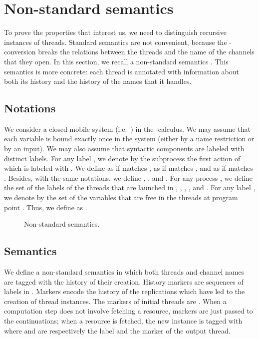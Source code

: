 \documentclass{article}
\newcommand{\picalcul}{-calculus}
\begin{document}
\section{Non-standard semantics}
\label{non-stan}

To prove the properties that interest us, we need to distinguish recursive instances of threads. 
Standard semantics are not convenient, because the -conversion breaks the relations between the threads and the name of the channels that they open. In this section, we recall a non-standard semantics \cite{feret:sas2000,feret:jlap,feret:thesis}. This semantics is more concrete: each thread is annotated with information about both its history and the history of the names that it handles. 


\subsection{Notations}
We consider a closed mobile system  (i.e.~) in the \picalcul.
We may assume  that each variable is bound  exactly once in the system (either by a name restriction or by an input).
We may also assume that syntactic components  are labeled with distinct labels.
For any label , we denote by   the subprocess the first action of which is labeled with  .
We define  as  if   matches , as  if   matches , and as  if   matches .
Besides, with the same notations, we define , , and . 
For any process , we define the set  of the labels of the threads that are launched in , 
, 
, 
, and 
.
For any label , we denote by  the set of the variables that are free  in the threads at program point .
Thus, we define  as .



\begin{figure*}[t]

\caption{Non-standard semantics.}
\label{non-standard semantics}
\end{figure*}


\subsection{Semantics}
We define a non-standard semantics in which both threads and channel names are tagged with the history of their creation. 
History markers  are sequences of labels in .
Markers encode the history of the replications which have led to the creation of thread instances. 
The markers of initial threads are . 
When a computation step does not involve fetching a resource,
markers are just passed to the continuations; when a resource is fetched, the new instance is tagged with   where  and  are respectively  the label and the marker of the output thread. 
\end{document}
